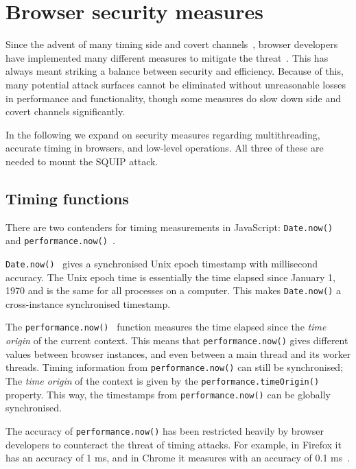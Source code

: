 \documentclass[11pt,
  titlepage=false,
  parskip=half,      %
]{scrreprt}
\begin{document}
\section{Browser security measures}
\label{sec:browsersecurity}
Since the advent of many timing side and covert channels~\cite{noack2018exploiting, Rokicki2022webport, gruss2016rowhammer, 185126},
browser developers have implemented many different measures to mitigate the threat~\cite{shusterman2021prime, performancenow, performancenowchrome, schwarz2018javascript}.
This has always meant striking a balance between security and efficiency.
Because of this, many potential attack surfaces cannot be eliminated without unreasonable losses in performance and functionality,
though some measures do slow down side and covert channels significantly.

In the following we expand on security measures regarding multithreading, accurate timing in browsers, and low-level operations.
All three of these are needed to mount the SQUIP attack.


\subsection{Timing functions}\label{subsec:timingjs}
There are two contenders for timing measurements in JavaScript: \texttt{Date.now()}~\cite{datenow} and \texttt{performance.now()}~\cite{performancenow}.

\texttt{Date.now()}~\cite{datenow} gives a synchronised Unix epoch timestamp with millisecond accuracy.
The Unix epoch time is essentially the time elapsed since January 1, 1970 and is the same for all processes on a computer.
This makes \texttt{Date.now()} a cross-instance synchronised timestamp.

The \texttt{performance.now()}~\cite{performancenow} function measures the time elapsed since the \textit{time origin} of the current context.
This means that \texttt{performance.now()} gives different values between browser instances, and even between a main thread and its worker threads.
Timing information from \texttt{performance.now()} can still be synchronised;
The \textit{time origin} of the context is given by the \texttt{performance.timeOrigin()}~\cite{performancetimeorigin} property.
This way, the timestamps from \texttt{performance.now()} can be globally synchronised.

The accuracy of \texttt{performance.now()} has been restricted heavily by browser developers to counteract the threat of timing attacks.
For example, in Firefox it has an accuracy of 1 ms, and in Chrome it measures with an accuracy of 0.1 ms~\cite{performancenow, performancenowchrome}.
\end{document}
